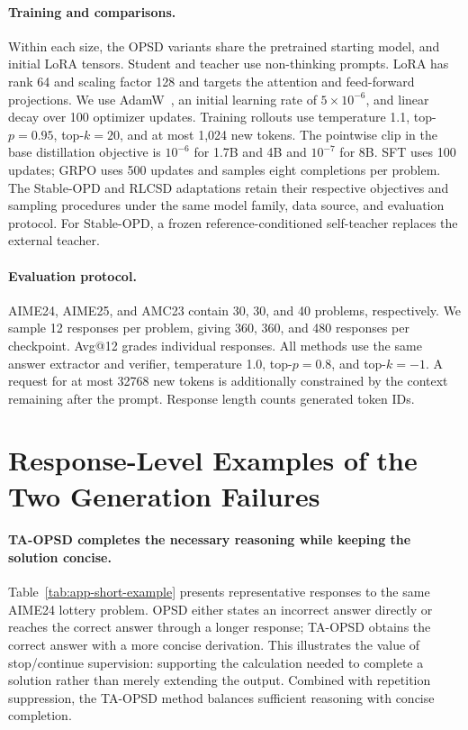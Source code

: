 \documentclass{article} %
\begin{document}
\paragraph{Training and comparisons.} Within each size, the OPSD variants share the pretrained starting model, and initial LoRA tensors. Student and teacher use non-thinking prompts. LoRA has rank 64 and scaling factor 128 and targets the attention and feed-forward projections. We use AdamW~\citep{loshchilov2019decoupledweightdecayregularization}, an initial learning rate of $5\times10^{-6}$, and linear decay over 100 optimizer updates. Training rollouts use temperature 1.1, top-$p=0.95$, top-$k=20$, and at most 1,024 new tokens. The pointwise clip in the base distillation objective is $10^{-6}$ for 1.7B and 4B and $10^{-7}$ for 8B. SFT uses 100 updates; GRPO uses 500 updates and samples eight completions per problem. The Stable-OPD and RLCSD adaptations retain their respective objectives and sampling procedures under the same model family, data source, and evaluation protocol. For Stable-OPD, a frozen reference-conditioned self-teacher replaces the external teacher.

\paragraph{Evaluation protocol.} AIME24, AIME25, and AMC23 contain 30, 30, and 40 problems, respectively. We sample 12 responses per problem, giving 360, 360, and 480 responses per checkpoint. Avg@12 grades individual responses. All methods use the same answer extractor and verifier, temperature 1.0, top-$p=0.8$, and top-$k=-1$. A request for at most 32768 new tokens is additionally constrained by the context remaining after the prompt. Response length counts generated token IDs.

\section{Response-Level Examples of the Two Generation Failures}
\label{app:response-examples}

\paragraph{TA-OPSD completes the necessary reasoning while keeping the solution concise.} Table~\ref{tab:app-short-example} presents representative responses to the same AIME24 lottery problem. OPSD either states an incorrect answer directly or reaches the correct answer through a longer response; TA-OPSD obtains the correct answer with a more concise derivation. This illustrates the value of stop/continue supervision: supporting the calculation needed to complete a solution rather than merely extending the output. Combined with repetition suppression, the TA-OPSD method balances sufficient reasoning with concise completion.
\end{document}

